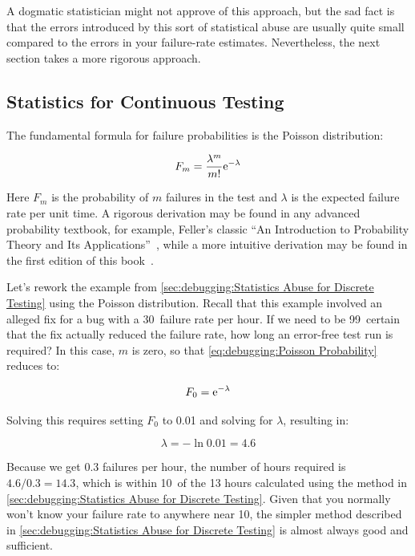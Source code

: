 A dogmatic statistician might not approve of this approach, but the sad
fact is that the errors introduced by this sort of statistical abuse are
usually quite small compared to the errors in your failure-rate estimates.
Nevertheless, the next section takes a more rigorous approach.

\subsection{Statistics for Continuous Testing}
\label{sec:debuggingStatistics for Continuous Testing}

The fundamental formula for failure probabilities is the Poisson
distribution:

\begin{equation}
	F_m = \frac{\lambda^m}{m!} \mathrm{e}^{-\lambda}
\label{eq:debugging:Poisson Probability}
\end{equation}

Here $F_m$ is the probability of $m$ failures in the test and
$\lambda$ is the expected failure rate per unit time.
A rigorous derivation may be found in any advanced probability
textbook, for example, Feller's classic ``An Introduction to Probability
Theory and Its Applications''~\cite{Feller58}, while a more
intuitive derivation may be found in the first edition of
this book~\cite[Equations 11.8--11.26]{McKenney2014ParallelProgramming-e1}.

Let's rework the example from
\cref{sec:debugging:Statistics Abuse for Discrete Testing}
using the Poisson distribution.
Recall that this example involved an alleged fix for a bug with a 30\pct\
failure rate per hour.
If we need to be 99\pct\ certain that the fix actually reduced the failure
rate, how long an error-free test run is required?
In this case, $m$ is zero, so that
\cref{eq:debugging:Poisson Probability} reduces to:

\begin{equation}
	F_0 =  \mathrm{e}^{-\lambda}
\end{equation}

Solving this requires setting $F_0$
to 0.01 and solving for $\lambda$, resulting in:

\begin{equation}
	\lambda = - \ln 0.01 = 4.6
\end{equation}

Because we get $0.3$ failures per hour, the number of hours required
is $4.6/0.3 = 14.3$, which is within 10\pct\ of the 13 hours
calculated using the method in
\cref{sec:debugging:Statistics Abuse for Discrete Testing}.
Given that you normally won't know your failure rate to anywhere near
10\pct, the simpler method described in
\cref{sec:debugging:Statistics Abuse for Discrete Testing}
is almost always good and sufficient.

